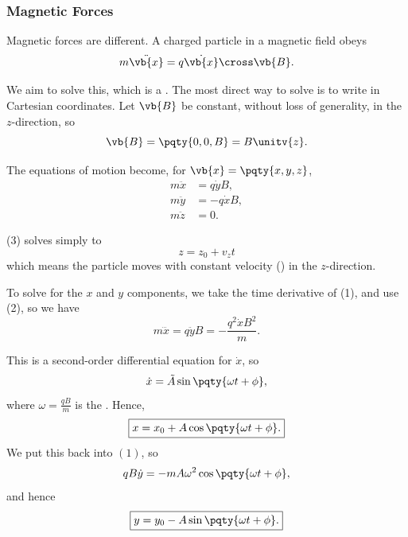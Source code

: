 \subsubsection{Magnetic Forces}

Magnetic forces are different. A charged particle in a magnetic field obeys
\begin{equation}
    m \ddot{\vb{x}} = q \dot{\vb{x}} \cross \vb{B}.
\end{equation}

We aim to solve this, which is a . The most direct way to solve is to write in Cartesian coordinates. Let \(\vb{B}\) be constant, without loss of generality, in the \(z\)-direction, so
\begin{equation}
    \vb{B} = \pqty{0, 0, B} = B \unitv{z}.
\end{equation}

The equations of motion become, for \(\vb{x} = \pqty{x, y, z}\),
\begin{subequations}\begin{align}
    m \ddot{x} &= q \dot{y} B \tag{1}, \\
    m \ddot{y} &= -q \dot{x} B \tag{2}, \\
    m \ddot{z} &= 0. \tag{3}
\end{align}\end{subequations}

(3) solves simply to
\begin{equation}
    \boxed{z = z_0 + v_z t}
\end{equation}
which means the particle moves with constant velocity () in the \(z\)-direction.

To solve for the \(x\) and \(y\) components, we take the time derivative of (1), and use (2), so we have
\begin{equation}
    m \dddot{x} = q \ddot{y} B = - \frac{q^2 \dot{x} B^2}{m}.
\end{equation}

This is a second-order differential equation for \(\dot{x}\), so
\begin{equation}
    \dot{x} = \tilde{A} \sin \pqty{\omega t + \phi},
\end{equation}
where \(\boxed{\omega = \frac{qB}{m}}\) is the . Hence,
\begin{equation}
    \boxed{x = x_0 + A \cos \pqty{\omega t + \phi}.}
\end{equation}
We put this back into \((1)\), so
\begin{equation}
    q B \dot{y} = - m A \omega^2 \cos \pqty{\omega t + \phi},
\end{equation}
and hence
\begin{equation}
    \boxed{y = y_0 - A \sin \pqty{\omega t + \phi}.}
\end{equation}

